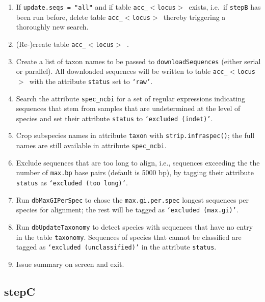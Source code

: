 \documentclass[12pt]{article}
\newcommand{\acctab}{table \texttt{acc\_$<$locus$>$ }}
\begin{document}
\begin{enumerate}
\item If \texttt{update.seqs = "all"} and if \acctab exists, i.e.~if \texttt{stepB} has been run before, delete \acctab thereby triggering a thoroughly new search.

\item (Re-)create \acctab.

\item Create a list of taxon names to be passed to \texttt{downloadSequences} (either serial or parallel). All downloaded sequences will be written to \acctab with the attribute \texttt{status} set to \texttt{`raw'}.

\item Search the attribute \texttt{spec\_ncbi} for a set of regular expressions indicating sequences that stem from samples that are undetermined at the level of species and set their attribute \texttt{status} to \texttt{`excluded (indet)'}.

\item Crop subspecies names in attribute \texttt{taxon} with \texttt{strip.infraspec()}; the full names are still available in attribute \texttt{spec\_ncbi}.

\item Exclude sequences that are too long to align, i.e., sequences exceeding the the number of \texttt{max.bp} base pairs (default is 5000 bp), by tagging their attribute \texttt{status} as \texttt{`excluded (too long)'}.

\item Run \texttt{dbMaxGIPerSpec} to chose the \texttt{max.gi.per.spec} longest sequences per species for alignment; the rest will be tagged as \texttt{`excluded (max.gi)'}.

\item Run \texttt{dbUpdateTaxonomy} to detect species with sequences that have no entry in the table \texttt{taxonomy}. Sequences of species that cannot be classified are tagged as \texttt{`excluded (unclassified)'} in the attribute \texttt{status}.

\item Issue summary on screen and exit.
\end{enumerate}

\subsection{stepC}
\end{document}
